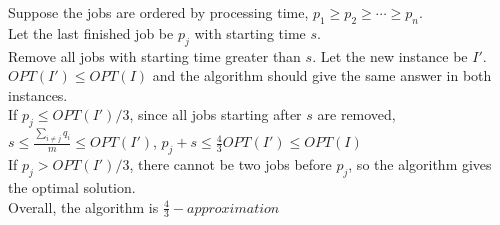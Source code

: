 \documentclass[12pt]{article}
\begin{document}
Suppose the jobs are ordered by processing time, $p_1\geq p_2\geq \cdots\geq p_n$.\\
Let the last finished job be $p_j$ with starting time $s$.\\
Remove all jobs with starting time greater than $s$. Let the new instance be $I'$. $OPT(I')\leq OPT(I)$ and the algorithm should give the same answer in both instances.\\
If $p_j\leq OPT(I')/3$, since all jobs starting after $s$ are removed, $s\leq \frac{\sum_{i\neq j}q_i}{m}\leq OPT(I')$, $p_j+s\leq \frac{4}{3}OPT(I')\leq OPT(I)$\\
If $p_j> OPT(I')/3$, there cannot be two jobs before $p_j$, so the algorithm gives the optimal solution.\\
Overall, the algorithm is $\frac{4}{3}-approximation$
\end{document}
